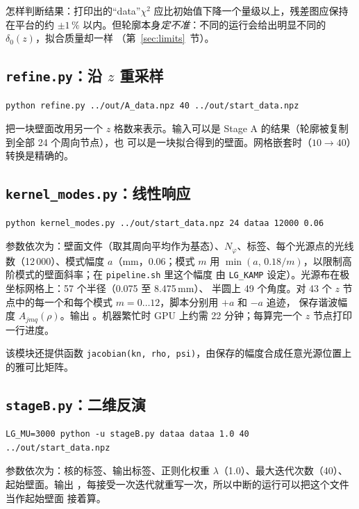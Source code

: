 \documentclass[11pt,a4paper,fontset=fandol]{ctexart}
\newcommand{\code}[1]{\texttt{#1}}
\begin{document}
怎样判断结果：打印出的“data”$\chi^2$ 应比初始值下降一个量级以上，残差图应保持在平台的约 $\pm1\,\%$
以内。但轮廓本身\emph{定不准}：不同的运行会给出明显不同的 $\delta_0(z)$，拟合质量却一样
（第~\ref{sec:limits}~节）。

\subsection{\texttt{refine.py}：沿 $z$ 重采样}

\begin{lstlisting}
python refine.py ../out/A_data.npz 40 ../out/start_data.npz
\end{lstlisting}
把一块壁面改用另一个 $z$ 格数来表示。输入可以是 Stage A 的结果（轮廓被复制到全部 24 个周向节点），也
可以是一块拟合得到的壁面。网格嵌套时（$10\to40$）转换是精确的。

\subsection{\texttt{kernel\_modes.py}：线性响应}

\begin{lstlisting}
python kernel_modes.py ../out/start_data.npz 24 dataa 12000 0.06
\end{lstlisting}
参数依次为：壁面文件（取其周向平均作为基态）、$N_\varphi$、标签、每个光源点的光线数（12\,000）、模式幅度
$a$（mm，0.06；模式 $m$ 用 $\min(a,\,0.18/m)$，以限制高阶模式的壁面斜率；在 \code{pipeline.sh} 里这个幅度
由 \code{LG\_KAMP} 设定）。光源布在极坐标网格上：57 个半径（0.075 至 8.475\,mm）、
半圆上 49 个角度。对 43 个 $z$ 节点中的每一个和每个模式 $m=0\ldots12$，脚本分别用 $+a$ 和 $-a$ 追迹，
保存谐波幅度 $A_{jmq}(\rho)$。输出 。机器繁忙时 GPU 上约需 22 分钟；每算完一个 $z$
节点打印一行进度。

该模块还提供函数 \code{jacobian(kn, rho, psi)}，由保存的幅度合成任意光源位置上的雅可比矩阵。

\subsection{\texttt{stageB.py}：二维反演}

\begin{lstlisting}
LG_MU=3000 python -u stageB.py dataa dataa 1.0 40 ../out/start_data.npz
\end{lstlisting}
参数依次为：核的标签、输出标签、正则化权重 $\lambda$（1.0）、最大迭代次数（40）、起始壁面。输出
，每接受一次迭代就重写一次，所以中断的运行可以把这个文件当作起始壁面
接着算。
\end{document}
